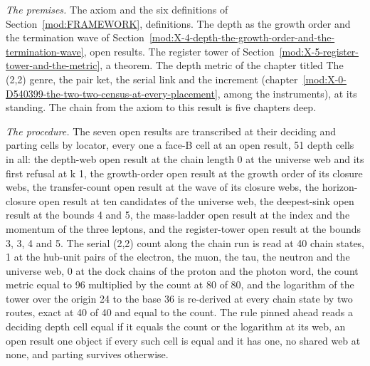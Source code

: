 \begin{chproof}
\textit{The premises.} The axiom and the six definitions of Section~\ref{mod:FRAMEWORK}, definitions. The depth as the growth order and the termination wave of Section~\ref{mod:X-4-depth-the-growth-order-and-the-termination-wave}, open results. The register tower of Section~\ref{mod:X-5-register-tower-and-the-metric}, a theorem. The depth metric of the chapter titled The (2,2) genre, the pair ket, the serial link and the increment (chapter~\ref{mod:X-0-D540399-the-two-two-census-at-every-placement}, among the instruments), at its standing. The chain from the axiom to this result is five chapters deep.

\textit{The procedure.} The seven open results are transcribed at their deciding and parting cells by locator, every one a face-B cell at an open result, 51 depth cells in all: the depth-web open result at the chain length 0 at the universe web and its first refusal at k 1, the growth-order open result at the growth order of its closure webs, the transfer-count open result at the wave of its closure webs, the horizon-closure open result at ten candidates of the universe web, the deepest-sink open result at the bounds 4 and 5, the mass-ladder open result at the index and the momentum of the three leptons, and the register-tower open result at the bounds 3, 3, 4 and 5. The serial (2,2) count along the chain run is read at 40 chain states, 1 at the hub-unit pairs of the electron, the muon, the tau, the neutron and the universe web, 0 at the dock chains of the proton and the photon word, the count metric equal to 96 multiplied by the count at 80 of 80, and the logarithm of the tower over the origin 24 to the base 36 is re-derived at every chain state by two routes, exact at 40 of 40 and equal to the count. The rule pinned ahead reads a deciding depth cell equal if it equals the count or the logarithm at its web, an open result one object if every such cell is equal and it has one, no shared web at none, and parting survives otherwise.


\end{chproof}

